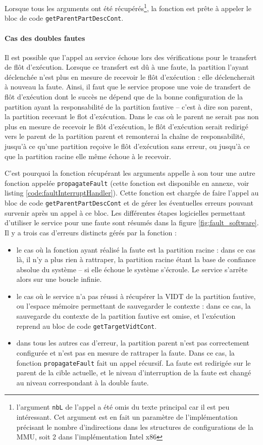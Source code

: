 		Lorsque tous les arguments ont été récupérés\footnote{l'argument \texttt{nbL} de l'appel a été omis du texte principal car il est peu intéressant. Cet argument est en fait un paramètre de l'implémentation précisant le nombre d'indirections dans les structures de configurations de la MMU, soit 2 dans l'implémentation Intel x86}, la fonction est prête à appeler le bloc de code \texttt{getParentPartDescCont}.

		\paragraph{Cas des doubles fautes} Il est possible que l'appel au service échoue lors des vérifications pour le transfert de flôt d'exécution. Lorsque ce transfert est dû à une faute, la partition l'ayant déclenchée n'est plus en mesure de recevoir le flôt d'exécution : elle déclencherait à nouveau la faute. Ainsi, il faut que le service propose une voie de transfert de flôt d'exécution dont le succès ne dépend que de la bonne configuration de la partition ayant la responsabilité de la partition fautive -- c'est à dire son parent, la partition recevant le flot d'exécution.
		Dans le cas où le parent ne serait pas non plus en mesure de recevoir le flôt d'exécution, le flôt d'exécution serait redirigé vers le parent de la partition parent et remonterai la chaîne de responsabilité, jusqu'à ce qu'une partition reçoive le flôt d'exécution sans erreur, ou jusqu'à ce que la partition racine elle même échoue à le recevoir.

		C'est pourquoi la fonction récupérant les arguments appelle à son tour une autre fonction appelée \texttt{propagateFault} (cette fonction est disponible en annexe, voir listing \ref{code:faultInterruptHandler}). Cette fonction est chargée de faire l'appel au bloc de code \texttt{getParentPartDescCont} et de gérer les éventuelles erreurs pouvant survenir après un appel à ce bloc. 
		Les différentes étapes logicielles permettant d'utiliser le service pour une faute sont résumés dans la figure \ref{fig:fault_software}. Il y a trois cas d'erreurs distincts gérés par la fonction :
		\begin{itemize}
			\item le cas où la fonction ayant réalisé la faute est la partition racine : dans ce cas là, il n'y a plus rien à rattraper, la partition racine étant la base de confiance absolue du système -- si elle échoue le système s'écroule. Le service s'arrête alors sur une boucle infinie.
			\item le cas où le service n'a pas réussi à récupérer la VIDT de la partition fautive, ou l'espace mémoire permettant de sauvegarder le contexte : dans ce cas, la sauvegarde du contexte de la partition fautive est omise, et l'exécution reprend au bloc de code \texttt{getTargetVidtCont}.
			\item dans tous les autres cas d'erreur, la partition parent n'est pas correctement configurée et n'est pas en mesure de rattraper la faute. Dans ce cas, la fonction \texttt{propagateFault} fait un appel récursif. La faute est redirigée sur le parent de la cible actuelle, et le niveau d'interruption de la faute est changé au niveau correspondant à la double faute.
		\end{itemize}


